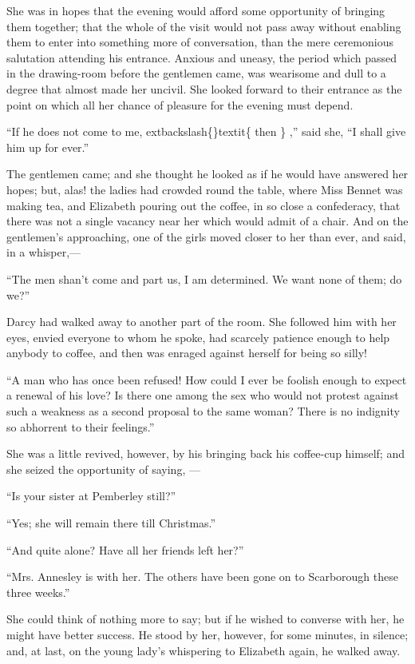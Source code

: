 \documentclass[10pt]{book}
\begin{document}
   She was in hopes that the evening would afford some opportunity of
bringing them together; that the whole of the visit would not pass away
without enabling them
   to enter into something more of conversation,
than the mere ceremonious salutation attending his entrance. Anxious and
uneasy, the period which passed in the drawing-room before the gentlemen
came, was wearisome and dull to a degree that almost made her uncivil.
She looked forward to their entrance as the point on which all her
chance of pleasure for the evening must depend.
  

   “If he does not come to me,
   	extbackslash\{\}textit\{
    then
   \}
   ,” said she, “I shall give him up for
ever.”
  

   The gentlemen came; and she thought he looked as if he would have
answered her hopes; but, alas! the ladies had crowded round the table,
where Miss Bennet was making tea, and Elizabeth pouring out the coffee,
in so close a confederacy, that there was not a single vacancy near her
which would admit of a chair. And on the gentlemen’s approaching, one of
the girls moved closer to her than ever, and said, in a whisper,—
  

   “The men shan’t come and part us, I am determined. We want none of them;
do we?”
  

   Darcy had walked away to another part of the room. She followed him with
her eyes, envied everyone to whom he spoke, had scarcely patience enough
to help anybody to coffee, and then was enraged against herself for
being so silly!
  

   “A man who has once been refused! How could I ever be foolish enough to
expect a renewal of his love? Is there one among the sex who would not
protest against such a weakness as a second proposal to the same woman?
There is no indignity so abhorrent to their feelings.”
  

   She was a little revived, however, by his bringing back his coffee-cup
himself; and she seized the opportunity of saying,
   —
  

   “Is your sister at Pemberley still?”
  

   “Yes; she will remain there till Christmas.”
  

   “And quite alone? Have all her friends left her?”
  

   “Mrs. Annesley is with her. The others have been gone on to Scarborough
these three weeks.”
  

   She could think of nothing more to say; but if he wished to converse
with her, he might have better success. He stood by her, however, for
some minutes, in silence; and, at last, on the young lady’s whispering
to Elizabeth again, he walked away.
  
\end{document}
